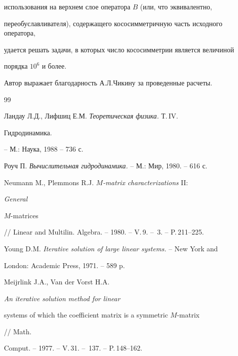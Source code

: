 использования на верхнем слое оператора $B$ (или, что эквивалентно, 


переобуславливателя), содержащего кососимметричную часть исходного оператора, 


удается решать задачи, в которых число кососимметрии является величиной 


порядка $10^6$ и более. 


 


Автор выражает благодарность А.Л.Чикину за проведенные расчеты. 


 


\begin{thebibliography}{99} 


 




Ландау Л.Д., Лифшиц Е.М. {\em Теоретическая физика.} Т.\,IV. {\em 


Гидродинамика.} -- М.: Наука, 1988 -- 736 с. 





 Роуч П. {\em Вычислительная гидродинамика.} -- М.: Мир, 1980. -- 616 с. 







Neumann M., Plemmons R.J. {\em $M$-matrix characterizations} II: {\em General 


$M$-matrices} 


// Linear and Multilin. Algebra. -- 1980. -- V.\,9. -- \No\,3. -- P.\,211--225. 







Young D.M. {\em Iterative solution of large linear systems.} -- New York and 


London: Academic Press, 1971. -- 589 p. 







Meijrlink J.A., Van der Vorst H.A. {\em An iterative solution method for linear 


systems of which the coefficient matrix is a symmetric $M$-matrix} // Math. 


Comput. -- 1977. -- V.\,31. -- \No\,137. -- P.\,148--162.






\end{thebibliography}
